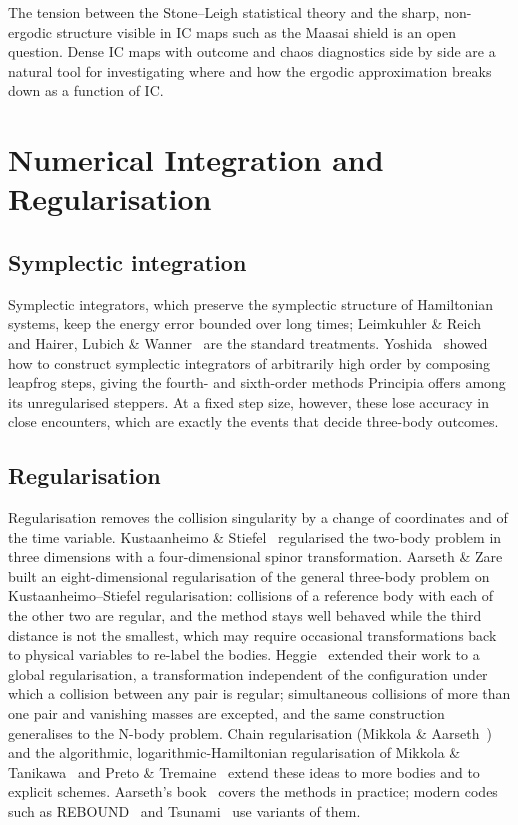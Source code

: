 \documentclass[11pt,a4paper]{article}
\begin{document}
The tension between the Stone--Leigh statistical theory and the sharp, non-ergodic structure
visible in IC maps such as the Maasai shield is an open question.  Dense IC maps with outcome and
chaos diagnostics side by side are a natural tool for investigating where and how the ergodic
approximation breaks down as a function of IC.

\section{Numerical Integration and Regularisation}

\subsection{Symplectic integration}

Symplectic integrators, which preserve the symplectic structure of Hamiltonian systems, keep the
energy error bounded over long times; Leimkuhler \& Reich~\cite{leimkuhler2004} and Hairer, Lubich
\& Wanner~\cite{hairer2006} are the standard treatments.  Yoshida~\cite{yoshida1990} showed how to
construct symplectic integrators of arbitrarily high order by composing leapfrog steps, giving
the fourth- and sixth-order methods Principia offers among its unregularised steppers.  At a
fixed step size, however, these lose accuracy in close encounters, which are exactly the events
that decide three-body outcomes.

\subsection{Regularisation}

Regularisation removes the collision singularity by a change of coordinates and of the time
variable.  Kustaanheimo \& Stiefel~\cite{ks1965} regularised the two-body problem in three
dimensions with a four-dimensional spinor transformation.  Aarseth \& Zare~\cite{aarseth1974}
built an eight-dimensional regularisation of the general three-body problem on Kustaanheimo--Stiefel
regularisation: collisions of a reference body with each of the other two are regular, and the
method stays well behaved while the third distance is not the smallest, which may require
occasional transformations back to physical variables to re-label the bodies.  Heggie~\cite{heggie1974}
extended their work to a global regularisation, a transformation independent of the
configuration under which a collision between any pair is regular; simultaneous collisions of
more than one pair and vanishing masses are excepted, and the same construction generalises to
the N-body problem.  Chain regularisation
(Mikkola \& Aarseth~\cite{mikkola1993}) and the algorithmic, logarithmic-Hamiltonian
regularisation of Mikkola \& Tanikawa~\cite{mikkola1999} and Preto \& Tremaine~\cite{preto1999}
extend these ideas to more bodies and to explicit schemes.  Aarseth's
book~\cite{aarseth2003} covers the methods in practice; modern codes such as
REBOUND~\cite{rein2012} and Tsunami~\cite{trani2024} use variants of them.
\end{document}
